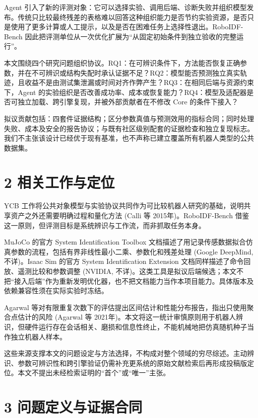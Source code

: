 \documentclass[
  chinese,
  11pt,
  a4paper,
  fontset=fandol]{ctexart}
\begin{document}
Agent
引入了新的评测对象：它可以选择实验、调用后端、诊断失败并组织模型发布。传统只比较最终残差的表格难以回答这种组织能力是否节约实验资源，是否只是使用了更多计算或人工提示，以及是否在困难任务上选择性退出。RoboIDF-Bench
因此把评测单位从一次优化扩展为``从固定初始条件到独立验收的完整运行''。

本文围绕四个研究问题组织协议。RQ1：在可辨识条件下，方法能否恢复正确参数，并在不可辨识或结构失配时承认证据不足？RQ2：模型能否预测独立真实轨迹，且收益不是由测试集泄漏或时间对齐作弊产生？RQ3：在相同后端与资源约束下，Agent
的实验组织是否改善成功率、成本或恢复能力？RQ4：模型及适配器是否可独立加载、跨引擎复现，并被外部贡献者在不修改
Core 的条件下接入？

拟议贡献包括：四套件证据结构；区分参数真值与预测效用的指标合同；同时处理失败、成本及安全的报告协议；与既有社区级别配套的证据检查和独立复现标志。我们不主张该设计已经优于现有基准，也不声称已建立覆盖所有机器人类型的公共数据集。

\section{2
相关工作与定位}\label{ux76f8ux5173ux5de5ux4f5cux4e0eux5b9aux4f4d}

YCB
工作将公共对象模型与实验协议共同作为可比较机器人研究的基础，说明共享资产之外还需要明确过程和量化方法
(Calli 等 2015年)。RoboIDF-Bench
借鉴这一原则，但评测目标是系统辨识与工作流，而非抓取任务本身。

MuJoCo 的官方 System Identification Toolbox
文档描述了用记录传感数据拟合仿真参数的流程，包括有界非线性最小二乘、参数化和残差处理
(Google DeepMind, 不详)。Isaac Sim 的官方 System Identification
Extension 文档同样描述了命令回放、遥测比较和参数调整 (NVIDIA,
不详)。这类工具是拟议后端候选；本文不把``接入后端''作为重新发明优化器，也不把文档能力当作本项目能力。具体版本及依赖兼容性须在实际实验时冻结。

Agarwal
等对有限重复次数下的评估提出区间估计和性能分布报告，指出只使用聚合点估计的风险
(Agarwal 等
2021年)。本文将这一统计审慎原则用于机器人辨识，但硬件运行存在会话相关、磨损和信息性终止，不能机械地把仿真随机种子当作独立机器人样本。

这些来源支撑本文的问题设定与方法选择，不构成对整个领域的穷尽综述。主动辨识、参数可辨识性和跨引擎验证仍需补充更系统的原始文献检索后再形成投稿版定位。本文不提出未经检索证明的``首个''或``唯一''主张。

\section{3
问题定义与证据合同}\label{ux95eeux9898ux5b9aux4e49ux4e0eux8bc1ux636eux5408ux540c}
\end{document}
